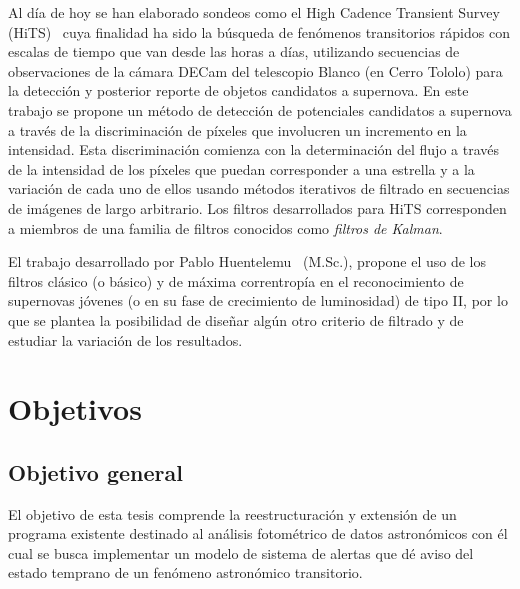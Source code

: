 Al d\'ia de hoy se han elaborado sondeos como el High Cadence Transient Survey (HiTS)~\cite{hits} cuya finalidad ha sido la b\'usqueda de fen\'omenos transitorios r\'apidos con escalas de tiempo que van desde las horas a d\'ias, utilizando secuencias de observaciones de la c\'amara DECam del telescopio Blanco (en Cerro Tololo) para la detecci\'on y posterior reporte de objetos candidatos a supernova. En este trabajo se propone un m\'etodo de detecci\'on de potenciales candidatos a supernova a trav\'es de la discriminaci\'on de p\'ixeles que involucren un incremento en la intensidad. Esta discriminaci\'on comienza con la determinaci\'on del flujo a trav\'es de la intensidad de los p\'ixeles que puedan corresponder a una estrella y a la variaci\'on de cada uno de ellos usando m\'etodos iterativos de filtrado en secuencias de im\'agenes de largo arbitrario. Los filtros desarrollados para HiTS corresponden a miembros de una familia de filtros conocidos como \textit{filtros de Kalman}.%
\bigskip


El trabajo desarrollado por Pablo Huentelemu~\cite{huentelemu} (M.Sc.), propone el uso de los filtros cl\'asico (o b\'asico) \cite{kalman} y de m\'axima correntrop\'ia \cite{chen} en el reconocimiento de supernovas j\'ovenes (o en su fase de crecimiento de luminosidad) de tipo II, por lo que se plantea la posibilidad de dise\~nar alg\'un otro criterio de filtrado y de estudiar la variaci\'on de los resultados.
\bigskip



\section{Objetivos}
\subsection{Objetivo general}
El objetivo de esta tesis comprende la reestructuraci\'on y extensi\'on de un programa existente destinado al an\'alisis fotom\'etrico de datos astron\'omicos con \'el cual se busca implementar un modelo de sistema de alertas que d\'e aviso del estado temprano de un fen\'omeno astron\'omico transitorio. 
\bigskip

